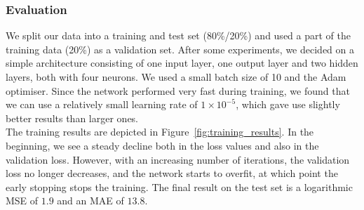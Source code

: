 \documentclass[acmsmall]{acmart}
\begin{document}
\subsubsection{Evaluation}
We split our data into a training and test set (80\%/20\%) and used a part of the training data (20\%) as a validation set. After some experiments, we decided on a simple architecture consisting of one input layer, one output layer and two hidden layers, both with four neurons. We used a small batch size of 10 and the Adam optimiser. Since the network performed very fast during training, we found that we can use a relatively small learning rate of $1 \times 10^{-5}$, which gave use slightly better results than larger ones. \\
The training results are depicted in Figure~\ref{fig:training_results}. In the beginning, we see a steady decline both in the loss values and also in the validation loss. However, with an increasing number of iterations, the validation loss no longer decreases, and the network starts to overfit, at which point the early stopping stops the training. 
The final result on the test set is a logarithmic MSE of $1.9$ and an MAE of $13.8$.
\end{document}
